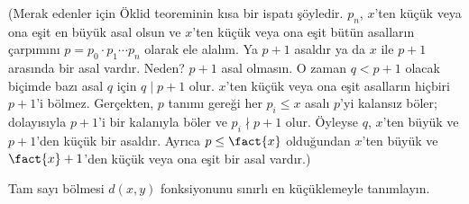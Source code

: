 \documentclass[../../../include/open-logic-section]{subfiles}
\begin{document}
(Merak edenler için Öklid teoreminin kısa bir ispatı şöyledir. $p_n$,
$x$'ten küçük veya ona eşit en büyük asal olsun ve $x$'ten küçük veya ona
eşit bütün asalların çarpımını
$p=p_0\cdot p_1\cdots p_n$ olarak ele alalım. Ya $p+1$ asaldır ya da $x$ ile
$p+1$ arasında bir asal vardır. Neden? $p+1$ asal olmasın. O zaman
$q<p+1$ olacak biçimde bazı asal $q$ için $q\mid p+1$ olur. $x$'ten küçük
veya ona eşit asalların hiçbiri $p+1$'i bölmez. Gerçekten, $p$ tanımı
gereği her $p_i\leq x$ asalı $p$'yi kalansız böler; dolayısıyla $p+1$'i
bir kalanıyla böler ve $p_i\nmid p+1$ olur. Öyleyse $q$, $x$'ten büyük ve
$p+1$'den küçük bir asaldır. Ayrıca $p\leq\fact{x}$ olduğundan $x$'ten büyük
ve $\fact{x}+1$'den küçük veya ona eşit bir asal vardır.)

\begin{prob}
Tam sayı bölmesi $d(x,y)$ fonksiyonunu sınırlı en küçüklemeyle tanımlayın.
\end{prob}
\end{document}
